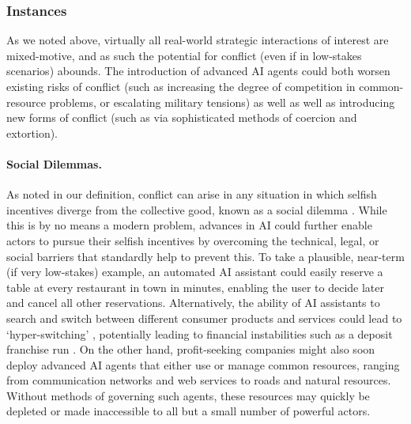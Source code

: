 \subsubsection{Instances}

As we noted above, virtually all real-world strategic interactions of interest are mixed-motive, and as such the potential for conflict (even if in low-stakes scenarios) abounds.
The introduction of advanced AI agents could both worsen existing risks of conflict (such as increasing the degree of competition in common-resource problems, or escalating military tensions) as well as well as introducing new forms of conflict (such as via sophisticated methods of coercion and extortion). 

\paragraph{Social Dilemmas.}
As noted in our definition, conflict can arise in any situation in which selfish incentives diverge from the collective good, known as a {social dilemma} \citep{Hardin1968,dawes1980social,kollock1998social,Ostrom1990}.
While this is by no means a modern problem, advances in AI could further enable actors to pursue their selfish incentives by overcoming the technical, legal, or social barriers that standardly help to prevent this.
To take a plausible, near-term (if very low-stakes) example, an automated AI assistant could easily reserve a table at every restaurant in town in minutes, enabling the user to decide later and cancel all other reservations.
Alternatively, the ability of AI assistants to search and switch between different consumer products and services could lead to `hyper-switching' \citep{VanLoo2019}, potentially leading to financial instabilities such as a deposit franchise run \citep[see also ]{Drechsler2023}.
On the other hand, profit-seeking companies might also soon deploy advanced AI agents that either use or manage common resources, ranging from communication networks and web services to roads and natural resources.
Without methods of governing such agents, these resources may quickly be depleted or made inaccessible to all but a small number of powerful actors.

